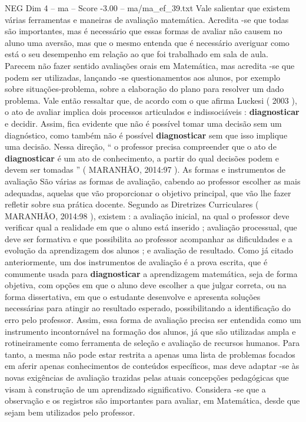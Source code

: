 \begin{textsample}{NEG Dim 4 – ma – Score -3.00 – ma/ma\_ef\_39.txt}
Vale salientar que existem várias ferramentas e maneiras de avaliação matemática.
Acredita -se que todas são importantes, mas é necessário que essas formas de avaliar não causem no aluno uma aversão, mas que o mesmo entenda que é necessário averiguar como está o seu desempenho em relação ao que foi trabalhado em sala de aula.
Parecem não fazer sentido avaliações orais em Matemática, mas acredita -se que podem ser utilizadas, lançando -se questionamentos aos alunos, por exemplo sobre situações-problema, sobre a elaboração do plano para resolver um dado problema.
Vale então ressaltar que, de acordo com o que afirma Luckesi ( 2003 ), o ato de avaliar implica dois processos articulados e indissociáveis : \textbf{diagnosticar} e decidir.
Assim, fica evidente que não é possível tomar uma decisão sem um diagnóstico, como também não é possível \textbf{diagnosticar} sem que isso implique uma decisão.
Nessa direção, “ o professor precisa compreender que o ato de \textbf{diagnosticar} é um ato de conhecimento, a partir do qual decisões podem e devem ser tomadas ” ( MARANHÃO, 2014:97 ).
As formas e instrumentos de avaliação São várias as formas de avaliação, cabendo ao professor escolher as mais adequadas, aquelas que vão proporcionar o objetivo principal, que vão lhe fazer refletir sobre sua prática docente.
Segundo as Diretrizes Curriculares ( MARANHÃO, 2014:98 ), existem : a avaliação inicial, na qual o professor deve verificar qual a realidade em que o aluno está inserido ; avaliação processual, que deve ser formativa e que possibilita ao professor acompanhar as dificuldades e a evolução da aprendizagem dos alunos ; e avaliação de resultado.
Como já citado anteriormente, um dos instrumentos de avaliação é a prova escrita, que é comumente usada para \textbf{diagnosticar} a aprendizagem matemática, seja de forma objetiva, com opções em que o aluno deve escolher a que julgar correta, ou na forma dissertativa, em que o estudante desenvolve e apresenta soluções necessárias para atingir ao resultado esperado, possibilitando a identificação do erro pelo professor.
Assim, essa forma de avaliação precisa ser entendida como um instrumento incontornável na formação dos alunos, já que são utilizadas ampla e rotineiramente como ferramenta de seleção e avaliação de recursos humanos.
Para tanto, a mesma não pode estar restrita a apenas uma lista de problemas focados em aferir apenas conhecimentos de conteúdos específicos, mas deve adaptar -se às novas exigências de avaliação trazidas pelas atuais concepções pedagógicas que visam à construção de um aprendizado significativo.
Considera -se que a observação e os registros são importantes para avaliar, em Matemática, desde que sejam bem utilizados pelo professor.

\end{textsample}

